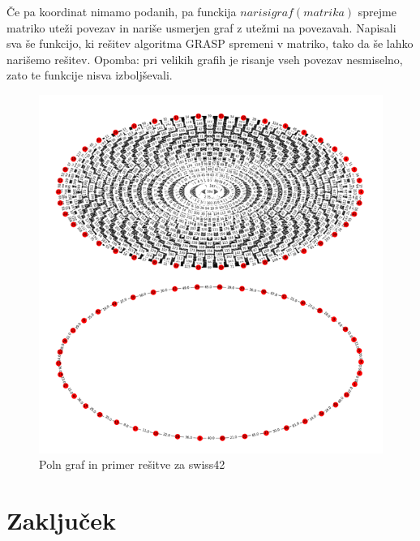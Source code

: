 \documentclass[12pt,a4paper]{amsart}
\theoremstyle{definition} %
\theoremstyle{plain} %
\begin{document}
Če pa koordinat nimamo podanih, pa funckija $narisigraf(matrika)$ sprejme matriko uteži povezav in nariše usmerjen graf z utežmi na povezavah. Napisali sva še funkcijo, ki rešitev algoritma GRASP spremeni v matriko, tako da še lahko narišemo rešitev. 
Opomba: pri velikih grafih je risanje vseh povezav nesmiselno, zato te funkcije nisva izboljševali.
\begin{figure}[H]
\caption{Poln graf in primer rešitve za swiss42}
\centering
\includegraphics[scale =0.5]{swiss_primerjava}
\end{figure}

\section{Zaključek}
\end{document}
